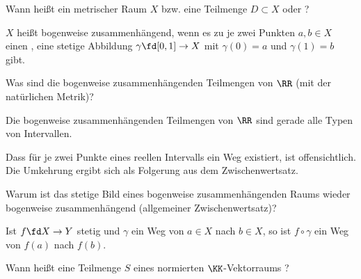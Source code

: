 \begin{frage}
  Wann heißt ein metrischer Raum $X$ bzw. eine Teilmenge $D\subset X$ 
   oder ?
\end{frage}

\begin{antwort}
  $X$ heißt bogenweise zusammenhängend, wenn es zu je zwei Punkten 
  $a,b\in X$ einen , {\dasheisst} eine stetige Abbildung 
  $\gamma\fd [0,1]\to X$ mit $\gamma(0)=a$ und $\gamma(1)=b$ gibt.
  \AntEnd
\end{antwort}

\begin{frage}
  Was sind die bogenweise zusammenhängenden Teilmengen von $\RR$ 
  (mit der natürlichen Metrik)?
\end{frage}

\begin{antwort}
  Die bogenweise zusammenhängenden Teilmengen von 
  $\RR$ sind gerade alle Typen von Intervallen.

  Dass für je zwei Punkte eines reellen Intervalls ein  
  Weg existiert, ist offensichtlich. Die Umkehrung ergibt sich als  
  Folgerung aus dem Zwischenwertsatz.
  \AntEnd
\end{antwort}




\begin{frage}
  Warum ist das stetige Bild eines bogenweise zusammenhängenden Raums wieder 
  bogenweise zusammenhängend (allgemeiner Zwischenwertsatz)?
\end{frage}


\begin{antwort}
  Ist $f \fd X\to Y$ stetig und $\gamma$ ein Weg von $a\in X$ 
  nach $b\in X$, so ist $f \circ \gamma$ ein Weg 
  von $f(a)$ nach $f(b)$.
  \AntEnd   
\end{antwort}




\begin{frage}
  Wann heißt eine Teilmenge $S$ eines normierten $\KK$-Vektorraums 
  ?
\end{frage}



